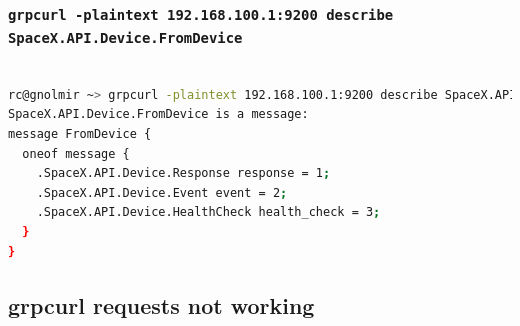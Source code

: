 \documentclass[IN,11pt,twoside,openright,bachelor,english]{tumthesis}
\begin{document}
\subsubsection{\texttt{grpcurl -plaintext 192.168.100.1:9200 describe SpaceX.API.Device.FromDevice}}
\begin{lstlisting}[language=bash,basicstyle=\tiny]

rc@gnolmir ~> grpcurl -plaintext 192.168.100.1:9200 describe SpaceX.API.Device.FromDevice
SpaceX.API.Device.FromDevice is a message:
message FromDevice {
  oneof message {
    .SpaceX.API.Device.Response response = 1;
    .SpaceX.API.Device.Event event = 2;
    .SpaceX.API.Device.HealthCheck health_check = 3;
  }
}
\end{lstlisting}



\subsection{grpcurl requests not working}
\end{document}
